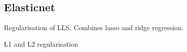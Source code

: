 
\subsection{Elasticnet}

Regularisation of LLS. Combines lasso and ridge regression.

L1 and L2 regularisation


